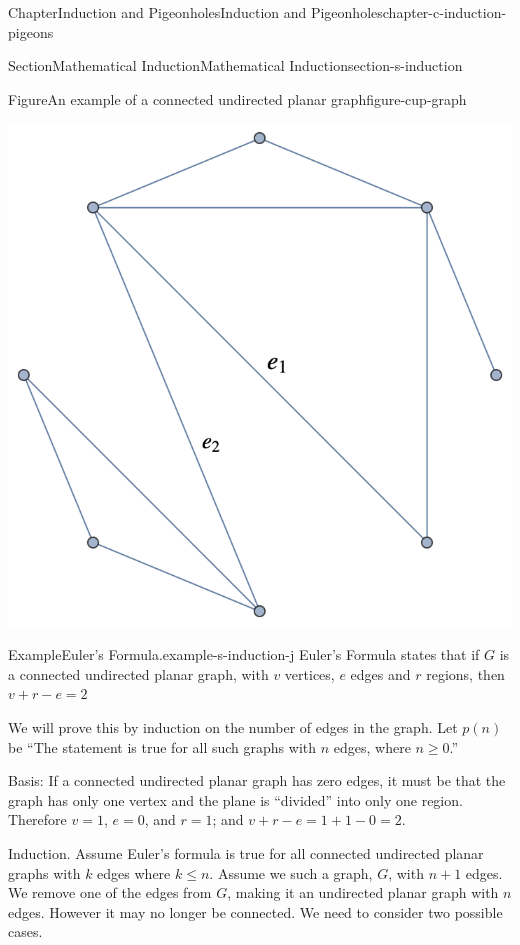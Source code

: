 \documentclass[oneside,10pt,]{book}
\numberwithin{equation}{section}
\begin{document}
\begin{chapterptx}{Chapter}{Induction and Pigeonholes}{}{Induction and Pigeonholes}{}{}{chapter-c-induction-pigeons}
\begin{sectionptx}{Section}{Mathematical Induction}{}{Mathematical Induction}{}{}{section-s-induction}
\begin{figureptx}{Figure}{An example of a connected undirected planar graph}{figure-cup-graph}{}
\begin{image}{0}{1}{0}
\includegraphics[width=\linewidth]{images/cup-graph.png}
\end{image}%
\tcblower
\end{figureptx}%
\begin{example}{Example}{Euler's Formula.}{example-s-induction-j}%
%
Euler's Formula states that if \(G\) is a connected undirected planar graph, with \(v\) vertices, \(e\) edges and \(r\) regions, then \(v+r-e=2\)%
\par
We will prove this by induction on the number of edges in the graph.  Let \(p(n)\) be ``The statement is true for all such graphs with \(n\) edges, where \(n\geq 0\).''%
\par
Basis:  If a connected undirected planar graph has zero edges, it must be that the graph has only one vertex and the plane is  ``divided'' into only one region.  Therefore \(v=1\), \(e=0\), and \(r=1\); and   \(v+r-e=1+1-0 =2\).%
\par
Induction.  Assume Euler's formula is true for all connected undirected planar graphs  with \(k\) edges where \(k\leq n\).   Assume we such a graph, \(G\), with \(n+1\) edges.  We remove one of the edges from \(G\), making it an undirected planar graph with \(n\) edges.  However it may no longer be connected.  We need to consider two possible cases.%
\par

\end{example}
\end{sectionptx}
\end{chapterptx}
\end{document}
